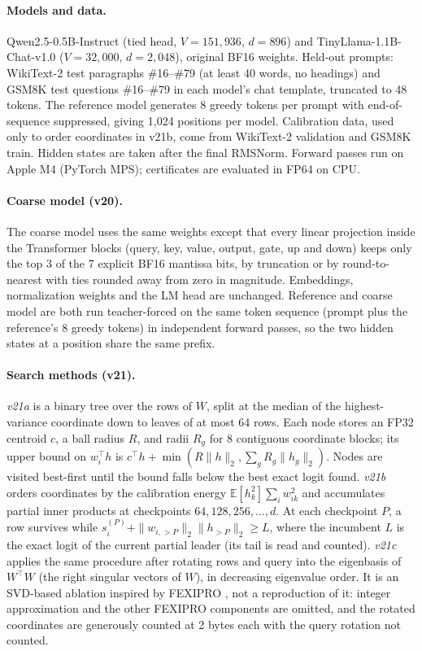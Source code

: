 \documentclass[11pt]{article}
\theoremstyle{definition}
\begin{document}
\paragraph{Models and data.} Qwen2.5-0.5B-Instruct (tied head, $V{=}151{,}936$,
$d{=}896$) and TinyLlama-1.1B-Chat-v1.0 ($V{=}32{,}000$, $d{=}2{,}048$), original
BF16 weights. Held-out prompts: WikiText-2 test paragraphs \#16--\#79 (at least 40
words, no headings) and GSM8K test questions \#16--\#79 in each model's chat
template, truncated to 48 tokens. The reference model generates 8 greedy tokens per
prompt with end-of-sequence suppressed, giving 1{,}024 positions per model.
Calibration data, used only to order coordinates in v21b, come from WikiText-2
validation and GSM8K train. Hidden states are taken after the final RMSNorm.
Forward passes run on Apple M4 (PyTorch MPS); certificates are evaluated in FP64
on CPU.

\paragraph{Coarse model (v20).} The coarse model uses the same weights except that
every linear projection inside the Transformer blocks (query, key, value, output,
gate, up and down) keeps only the top 3 of the 7 explicit BF16 mantissa bits, by
truncation or by round-to-nearest with ties rounded away from zero in magnitude.
Embeddings, normalization weights and the LM head are unchanged. Reference and
coarse model are both run teacher-forced on the same token sequence (prompt plus
the reference's 8 greedy tokens) in independent forward passes, so the two hidden
states at a position share the same prefix.

\paragraph{Search methods (v21).} \emph{v21a} is a binary tree over the rows of
$W$, split at the median of the highest-variance coordinate down to leaves of at
most 64 rows. Each node stores an FP32 centroid $c$, a ball radius $R$, and radii
$R_g$ for 8 contiguous coordinate blocks; its upper bound on $w_i^\top h$ is
$c^\top h+\min(R\|h\|_2,\sum_g R_g\|h_g\|_2)$. Nodes are visited best-first until
the bound falls below the best exact logit found. \emph{v21b} orders coordinates by
the calibration energy $\mathbb{E}[h_k^2]\sum_i w_{ik}^2$ and accumulates partial
inner products at checkpoints $64,128,256,\dots,d$. At each checkpoint $P$, a row
survives while $s_i^{(P)}+\|w_{i,>P}\|_2\|h_{>P}\|_2\geq L$, where the incumbent $L$
is the exact logit of the current partial leader (its tail is read and counted).
\emph{v21c} applies the same procedure after rotating rows and query into the
eigenbasis of $W^\top W$ (the right singular vectors of $W$), in decreasing
eigenvalue order. It is an SVD-based ablation inspired by FEXIPRO
\cite{li2017fexipro}, not a reproduction of it: integer approximation and the other
FEXIPRO components are omitted, and the rotated coordinates are generously counted at
2 bytes each with the query rotation not counted.
\end{document}
